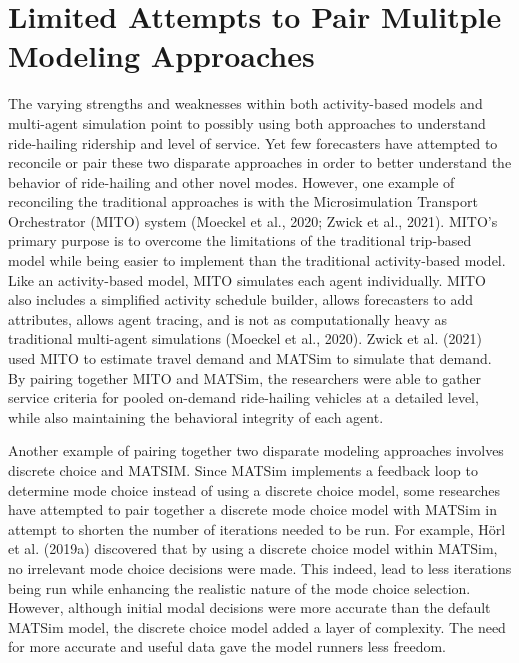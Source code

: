 \documentclass[fancy, masters]{byuthesis}
\begin{document}
\hypertarget{limited-attempts-to-pair-mulitple-modeling-approaches}{%
\section{Limited Attempts to Pair Mulitple Modeling Approaches}\label{limited-attempts-to-pair-mulitple-modeling-approaches}}

The varying strengths and weaknesses within both activity-based models and multi-agent simulation point to possibly using both approaches to understand ride-hailing ridership and level of service. Yet few forecasters have attempted to reconcile or pair these two disparate approaches in order to better understand the behavior of ride-hailing and other novel modes. However, one example of reconciling the traditional approaches is with the Microsimulation Transport Orchestrator (MITO) system (Moeckel et al., 2020; Zwick et al., 2021). MITO's primary purpose is to overcome the limitations of the traditional trip-based model while being easier to implement than the traditional activity-based model. Like an activity-based model, MITO simulates each agent individually. MITO also includes a simplified activity schedule builder, allows forecasters to add attributes, allows agent tracing, and is not as computationally heavy as traditional multi-agent simulations (Moeckel et al., 2020). Zwick et al. (2021) used MITO to estimate travel demand and MATSim to simulate that demand. By pairing together MITO and MATSim, the researchers were able to gather service criteria for pooled on-demand ride-hailing vehicles at a detailed level, while also maintaining the behavioral integrity of each agent.

Another example of pairing together two disparate modeling approaches involves discrete choice and MATSIM. Since MATSim implements a feedback loop to determine mode choice instead of using a discrete choice model, some researches have attempted to pair together a discrete mode choice model with MATSim in attempt to shorten the number of iterations needed to be run. For example, Hörl et al. (2019a) discovered that by using a discrete choice model within MATSim, no irrelevant mode choice decisions were made. This indeed, lead to less iterations being run while enhancing the realistic nature of the mode choice selection. However, although initial modal decisions were more accurate than the default MATSim model, the discrete choice model added a layer of complexity. The need for more accurate and useful data gave the model runners less freedom.
\end{document}
